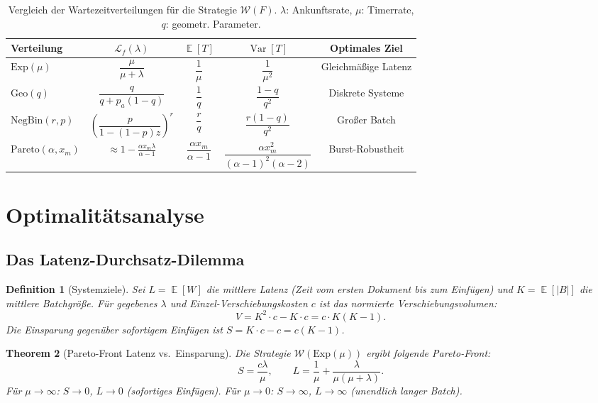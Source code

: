 ﻿\documentclass[12pt, a4paper]{article}
\newtheorem{theorem}{Theorem}[section]
\newtheorem{definition}[theorem]{Definition}
\DeclareMathOperator{\E}{\mathbb{E}}
\DeclareMathOperator{\Var}{Var}
\newcommand{\Geo}{\mathrm{Geo}}
\newcommand{\Exp}{\mathrm{Exp}}
\newcommand{\NBin}{\mathrm{NegBin}}
\newcommand{\Pareto}{\mathrm{Pareto}}
\begin{document}
\begin{table}[ht]
\centering
\caption{Vergleich der Wartezeitverteilungen für die Strategie $\mathcal{W}(F)$.
         $\lambda$: Ankunftsrate, $\mu$: Timerrate, $q$: geometr. Parameter.}
\label{tab:comparison}
\renewcommand{\arraystretch}{1.4}
\begin{tabular}{lcccc}
\toprule
\textbf{Verteilung} & $\mathcal{L}_f(\lambda)$ & $\E[T]$ & $\Var[T]$ &
  \textbf{Optimales Ziel}\\
\midrule
$\Exp(\mu)$
  & $\dfrac{\mu}{\mu+\lambda}$
  & $\dfrac{1}{\mu}$
  & $\dfrac{1}{\mu^2}$
  & Gleichmäßige Latenz\\[6pt]
$\Geo(q)$
  & $\dfrac{q}{q + p_a(1-q)}$
  & $\dfrac{1}{q}$
  & $\dfrac{1-q}{q^2}$
  & Diskrete Systeme\\[6pt]
$\NBin(r,p)$
  & $\left(\dfrac{p}{1-(1-p)z}\right)^r$
  & $\dfrac{r}{q}$
  & $\dfrac{r(1-q)}{q^2}$
  & Großer Batch\\[6pt]
$\Pareto(\alpha, x_m)$
  & $\approx 1 - \frac{\alpha x_m\lambda}{\alpha-1}$
  & $\dfrac{\alpha x_m}{\alpha-1}$
  & $\dfrac{\alpha x_m^2}{(\alpha-1)^2(\alpha-2)}$
  & Burst-Robustheit\\[6pt]
\bottomrule
\end{tabular}
\end{table}

\section{Optimalitätsanalyse}\label{sec:optimality}

\subsection{Das Latenz-Durchsatz-Dilemma}

\begin{definition}[Systemziele]\label{def:goals}
Sei $L = \E[W]$ die mittlere Latenz (Zeit vom ersten Dokument bis zum
Einfügen) und $K = \E[|B|]$ die mittlere Batchgröße. Für gegebenes $\lambda$
und Einzel-Verschiebungskosten $c$ ist das normierte Verschiebungsvolumen:
\[
  V = K^2 \cdot c - K \cdot c = c \cdot K(K-1).
\]
Die Einsparung gegenüber sofortigem Einfügen ist
$S = K \cdot c - c = c(K-1)$.
\end{definition}

\begin{theorem}[Pareto-Front Latenz vs.\ Einsparung]\label{thm:paretofront}
Die Strategie $\mathcal{W}(\Exp(\mu))$ ergibt folgende Pareto-Front:
\[
  S = \frac{c\lambda}{\mu}, \qquad L = \frac{1}{\mu} + \frac{\lambda}{\mu(\mu+\lambda)}.
\]
Für $\mu \to \infty$: $S \to 0$, $L \to 0$ (sofortiges Einfügen).
Für $\mu \to 0$: $S \to \infty$, $L \to \infty$ (unendlich langer Batch).
\end{theorem}
\end{document}
